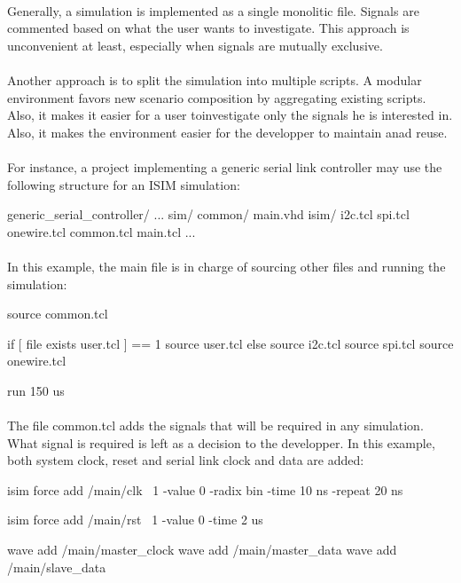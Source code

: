 \documentclass[12pt]{article}
\begin{document}


\todo{}



\paragraph{}
Generally, a simulation is implemented as a single monolitic file. Signals
are commented based on what the user wants to investigate. This approach is
unconvenient at least, especially when signals are mutually exclusive.
\paragraph{}
Another approach is to split the simulation into multiple scripts. A modular
environment favors new scenario composition by aggregating existing scripts.
Also, it makes it easier for a user toinvestigate only the signals he is
interested in. Also, it makes the environment easier for the developper to
maintain anad reuse.

\paragraph{}
For instance, a project implementing a generic serial link controller may use
the following structure for an ISIM simulation:
\begin{sh}
generic_serial_controller/
 ...
 sim/
  common/
   main.vhd
  isim/
   i2c.tcl
   spi.tcl
   onewire.tcl
   common.tcl
   main.tcl
 ...
\end{sh}

\paragraph{}
In this example, the main file is in charge of sourcing other files
and running the simulation:
\pagebreak
\begin{tcl}
source common.tcl

if { [ file exists user.tcl ] == 1 } {
 source user.tcl
} else {
 source i2c.tcl
 source spi.tcl
 source onewire.tcl
}

run 150 us
\end{tcl}

\paragraph{}
The file common.tcl adds the signals that will be required in any simulation.
What signal is required is left as a decision to the developper. In this
example, both system clock, reset and serial link clock and data are added:
\begin{tcl}
isim force add {/main/clk} \
 1 -value 0 -radix bin -time 10 ns -repeat 20 ns

isim force add {/main/rst} \
 1 -value 0 -time 2 us

wave add /main/master_clock
wave add /main/master_data
wave add /main/slave_data
\end{tcl}
\end{document}
